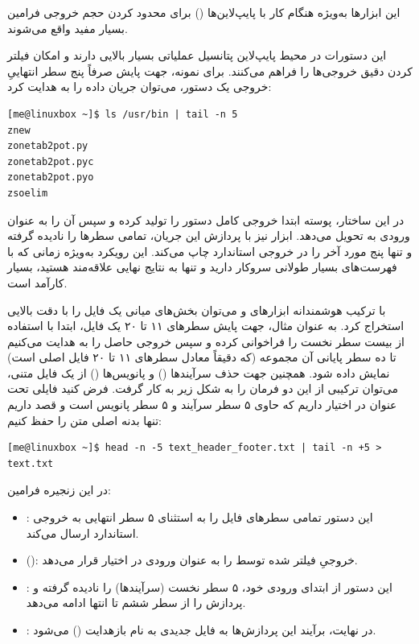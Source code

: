 این ابزارها به‌ویژه هنگام کار با پایپ‌لاین‌ها () برای محدود کردن حجم خروجی فرامین بسیار مفید واقع می‌شوند.

این دستورات در محیط پایپ‌لاین پتانسیل عملیاتی بسیار بالایی دارند و امکان فیلتر کردن دقیق خروجی‌ها را فراهم می‌کنند. برای نمونه، جهت پایش صرفاً پنج سطر انتهاییِ خروجی یک دستور، می‌توان جریان داده را به  هدایت کرد:

\begin{latin}
\begin{lstlisting}
[me@linuxbox ~]$ ls /usr/bin | tail -n 5
znew
zonetab2pot.py
zonetab2pot.pyc
zonetab2pot.pyo
zsoelim
\end{lstlisting}
\end{latin}

در این ساختار، پوسته ابتدا خروجی کامل دستور  را تولید کرده و سپس آن را به عنوان ورودی به  تحویل می‌دهد. ابزار  نیز با پردازش این جریان، تمامی سطرها را نادیده گرفته و تنها پنج مورد آخر را در خروجی استاندارد چاپ می‌کند. این رویکرد به‌ویژه زمانی که با فهرست‌های بسیار طولانی سروکار دارید و تنها به نتایج نهایی علاقه‌مند هستید، بسیار کارآمد است.

با ترکیب هوشمندانه ابزارهای  و  می‌توان بخش‌های میانی یک فایل را با دقت بالایی استخراج کرد. به عنوان مثال، جهت پایش سطرهای ۱۱ تا ۲۰ یک فایل، ابتدا با استفاده از  بیست سطر نخست را فراخوانی کرده و سپس خروجی حاصل را به  هدایت می‌کنیم تا ده سطر پایانی آن مجموعه (که دقیقاً معادل سطر‌های ۱۱ تا ۲۰ فایل اصلی است) نمایش داده شود. همچنین جهت حذف سرآیند‌ها () و پانویس‌ها () از یک فایل متنی، می‌توان ترکیبی از این دو فرمان را به شکل زیر به کار گرفت. فرض کنید فایلی تحت عنوان  در اختیار داریم که حاوی ۵ سطر سرآیند و ۵ سطر پانویس است و قصد داریم تنها بدنه اصلی متن را حفظ کنیم:

\begin{latin}
\begin{lstlisting}
[me@linuxbox ~]$ head -n -5 text_header_footer.txt | tail -n +5 > text.txt
\end{lstlisting}
\end{latin}

در این زنجیره فرامین:

\begin{itemize}
  \item {}: این دستور تمامی سطرهای فایل را به استثنای ۵ سطر انتهایی به خروجی استاندارد ارسال می‌کند.
  \item \cmd{|} (): خروجیِ فیلتر شده توسط  را به عنوان ورودی در اختیار  قرار می‌دهد.
  \item {}: این دستور از ابتدای ورودی خود، ۵ سطر نخست (سرآیند‌ها) را نادیده گرفته و پردازش را از سطر ششم تا انتها ادامه می‌دهد.
  \item \cmd{>}: در نهایت، برآیند این پردازش‌ها به فایل جدیدی به نام  بازهدایت () می‌شود.
\end{itemize}

